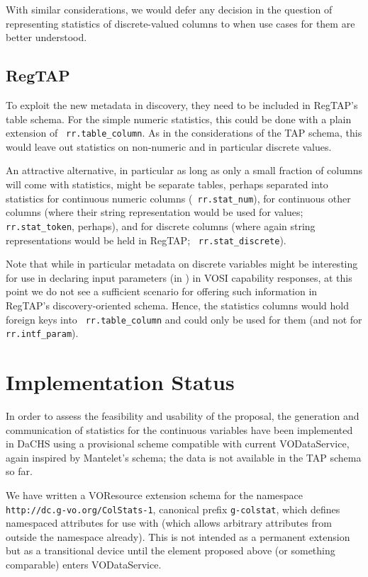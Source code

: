 \documentclass[11pt,a4paper]{ivoa}
\newcommand{\rtent}[1]{\texttt{\color{rtcolor} #1}}
\begin{document}
With similar considerations, we would defer any decision in the question
of representing statistics of discrete-valued columns to when use cases
for them are better understood.

\subsection{RegTAP}

To exploit the new metadata in discovery, they need to be included in
RegTAP's table schema.  For the simple numeric statistics, this could be
done with a plain extension of \rtent{rr.table\_column}.  As in the
considerations of the TAP schema, this would leave out statistics on
non-numeric and in particular discrete values.

An attractive alternative, in particular as long as only a small
fraction of columns will come with statistics, might be separate tables,
perhaps separated into statistics for continuous numeric columns
(\rtent{rr.stat\_num}), for continuous other columns (where their string
representation would be used for values; \rtent{rr.stat\_token},
perhaps), and for discrete columns (where again string representations
would be held in RegTAP; \rtent{rr.stat\_discrete}).

Note that while in particular metadata on discrete variables might be
interesting for use in declaring input parameters (in
) in VOSI capability responses, at this point we do
not see a sufficient scenario for offering such information in RegTAP's
discovery-oriented schema.  Hence, the statistics columns would hold
foreign keys into \rtent{rr.table\_column} and could only be used for
them (and not for \rtent{rr.intf\_param}).


\section{Implementation Status}

In order to assess the feasibility and usability of the proposal, the
generation and communication of statistics for the continuous variables
have been implemented in DaCHS using a provisional scheme compatible
with current VODataService, again inspired by Mantelet's schema; the
data is not available in the TAP schema so far.

We have written a VOResource extension schema for the namespace
\nolinkurl{http://dc.g-vo.org/ColStats-1}, canonical prefix
\verb|g-colstat|, which defines namespaced attributes for use
with  (which allows arbitrary attributes from
outside the namespace already).  This is not intended as a permanent
extension but as a transitional device until the  element
proposed above (or something comparable) enters VODataService.
\end{document}
